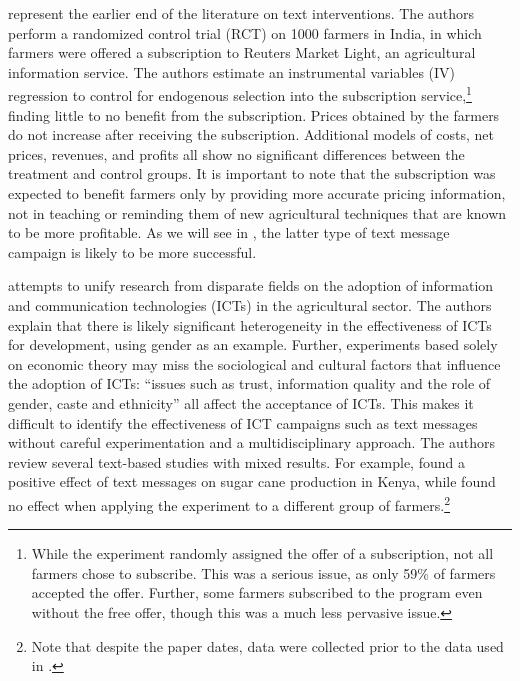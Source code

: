 \documentclass[12pt]{article}
\begin{document}
\textcite{fafchamps_impact_2012} represent the earlier end of the literature on text interventions. The authors perform a randomized control trial (RCT) on 1000 farmers in India, in which farmers were offered a subscription to Reuters Market Light, an agricultural information service. The authors estimate an instrumental variables (IV) regression to control for endogenous selection into the subscription service,\footnote{While the experiment randomly assigned the offer of a subscription, not all farmers chose to subscribe. This was a serious issue, as only 59\% of farmers accepted the offer. Further, some farmers subscribed to the program even without the free offer, though this was a much less pervasive issue.} finding little to no benefit from the subscription. Prices obtained by the farmers do not increase after receiving the subscription. Additional models of costs, net prices, revenues, and profits all show no significant differences between the treatment and control groups. It is important to note that the subscription was expected to benefit farmers only by providing more accurate pricing information, not in teaching or reminding them of new agricultural techniques that are known to be more profitable. As we will see in \textcite{fabregas_digital_2025}, the latter type of text message campaign is likely to be more successful.

\textcite{aker_promise_2016} attempts to unify research from disparate fields on the adoption of information and communication technologies (ICTs) in the agricultural sector. The authors explain that there is likely significant heterogeneity in the effectiveness of ICTs for development, using gender as an example. Further, experiments based solely on economic theory may miss the sociological and cultural factors that influence the adoption of ICTs: ``issues such as trust, information quality and the role of gender, caste and ethnicity'' all affect the acceptance of ICTs. This makes it difficult to identify the effectiveness of ICT campaigns such as text messages without careful experimentation and a multidisciplinary approach. The authors review several text-based studies with mixed results. For example, \textcite{casaburi_harnessing_2019} found a positive effect of text messages on sugar cane production in Kenya, while \textcite{casaburi_management_2016} found no effect when applying the experiment to a different group of farmers.\footnote{Note that despite the paper dates, \textcite{casaburi_harnessing_2019} data were collected prior to the data used in \textcite{casaburi_management_2016}.}
\end{document}
